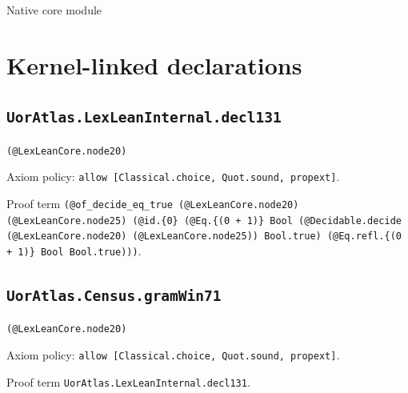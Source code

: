 \documentclass[11pt]{article}
\begin{document}
\begin{center}{\LARGE Native core module}\end{center}
\section*{Kernel-linked declarations}
\subsection*{\texttt{UorAtlas.LexLeanInternal.decl131}}
\noindent\texttt{(@LexLeanCore.node20)}\par
\noindent Axiom policy: \texttt{allow [Classical.choice, Quot.sound, propext]}.\par
\noindent Proof term \texttt{(@of\_decide\_eq\_true (@LexLeanCore.node20) (@LexLeanCore.node25) (@id.\{0\} (@Eq.\{(0 + 1)\} Bool (@Decidable.decide (@LexLeanCore.node20) (@LexLeanCore.node25)) Bool.true) (@Eq.refl.\{(0 + 1)\} Bool Bool.true)))}.\par
\subsection*{\texttt{UorAtlas.Census.gramWin71}}
\noindent\texttt{(@LexLeanCore.node20)}\par
\noindent Axiom policy: \texttt{allow [Classical.choice, Quot.sound, propext]}.\par
\noindent Proof term \texttt{UorAtlas.LexLeanInternal.decl131}.\par
\end{document}
